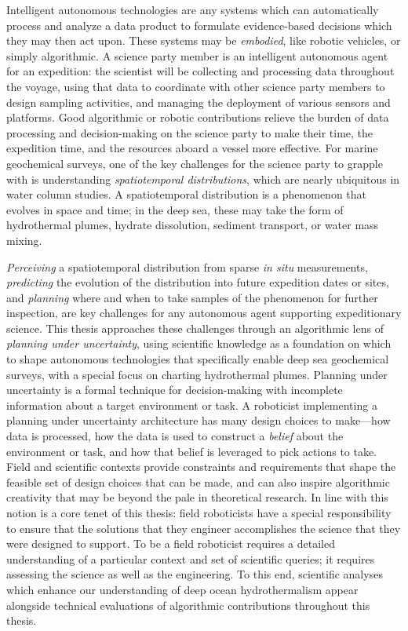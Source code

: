 Intelligent autonomous technologies are any systems which can automatically process and analyze a data product to formulate evidence-based decisions which they may then act upon.
These systems may be \emph{embodied}, like robotic vehicles, or simply algorithmic.
A science party member is an intelligent autonomous agent for an expedition: the scientist will be collecting and processing data throughout the voyage, using that data to coordinate with other science party members to design sampling activities, and managing the deployment of various sensors and platforms.
Good algorithmic or robotic contributions relieve the burden of data processing and decision-making on the science party to make their time, the expedition time, and the resources aboard a vessel more effective.
For marine geochemical surveys, one of the key challenges for the science party to grapple with is understanding \emph{spatiotemporal distributions}, which are nearly ubiquitous in water column studies.
A spatiotemporal distribution is a phenomenon that evolves in space and time; in the deep sea, these may take the form of hydrothermal plumes, hydrate dissolution, sediment transport, or water mass mixing.

\emph{Perceiving} a spatiotemporal distribution from sparse \emph{in situ} measurements, \emph{predicting} the evolution of the distribution into future expedition dates or sites, and \emph{planning} where and when to take samples of the phenomenon for further inspection, are key challenges for any autonomous agent supporting expeditionary science.
This thesis approaches these challenges through an algorithmic lens of \emph{planning under uncertainty}, using scientific knowledge as a foundation on which to shape autonomous technologies that specifically enable deep sea geochemical surveys, with a special focus on charting hydrothermal plumes.
Planning under uncertainty is a formal technique for decision-making with incomplete information about a target environment or task.
A roboticist implementing a planning under uncertainty architecture has many design choices to make---how data is processed, how the data is used to construct a \emph{belief} about the environment or task, and how that belief is leveraged to pick actions to take.
Field and scientific contexts provide constraints and requirements that shape the feasible set of design choices that can be made, and can also inspire algorithmic creativity that may be beyond the pale in theoretical research.
In line with this notion is a core tenet of this thesis: field roboticists have a special responsibility to ensure that the solutions that they engineer accomplishes the science that they were designed to support.
To be a field roboticist requires a detailed understanding of a particular context and set of scientific queries; it requires assessing the science as well as the engineering.
To this end, scientific analyses which enhance our understanding of deep ocean hydrothermalism appear alongside technical evaluations of algorithmic contributions throughout this thesis. 

